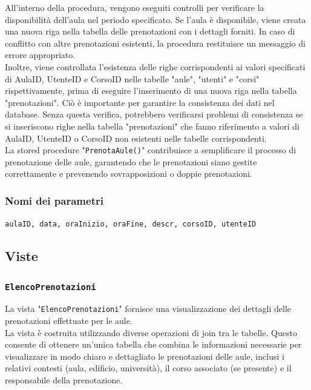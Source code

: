 \documentclass[a4paper, 10pt, oneside]{article} %
\begin{document}
All'interno della procedura, vengono eseguiti controlli per verificare la disponibilità dell'aula nel periodo specificato. Se l'aula è disponibile, viene creata una nuova riga nella tabella delle prenotazioni con i dettagli forniti. In caso di conflitto con altre prenotazioni esistenti, la procedura restituisce un messaggio di errore appropriato.\\

Inoltre, viene controllata l'esistenza delle righe corrispondenti ai valori specificati di AulaID, UtenteID e CorsoID nelle tabelle "aule", "utenti" e "corsi" rispettivamente, prima di eseguire l'inserimento di una nuova riga nella tabella "prenotazioni". Ciò è importante per garantire la consistenza dei dati nel database. Senza questa verifica, potrebbero verificarsi problemi di consistenza se si inseriscono righe nella tabella "prenotazioni" che fanno riferimento a valori di AulaID, UtenteID o CorsoID non esistenti nelle tabelle corrispondenti.\\

La stored procedure "\texttt{PrenotaAule()}" contribuisce a semplificare il processo di prenotazione delle aule, garantendo che le prenotazioni siano gestite correttamente e prevenendo sovrapposizioni o doppie prenotazioni.

\subsubsection*{Nomi dei parametri}

\texttt{aulaID, data, oraInizio, oraFine, descr, corsoID, utenteID}


\subsection{Viste}

\subsubsection*{\texttt{ElencoPrenotazioni}}

La vista "\texttt{ElencoPrenotazioni}" fornisce una visualizzazione dei dettagli delle prenotazioni effettuate per le aule.\\

La vista è costruita utilizzando diverse operazioni di join tra le tabelle. Questo consente di ottenere un'unica tabella che combina le informazioni necessarie per visualizzare in modo chiaro e dettagliato le prenotazioni delle aule, inclusi i relativi contesti (aula, edificio, università), il corso associato (se presente) e il responsabile della prenotazione.
\end{document}
